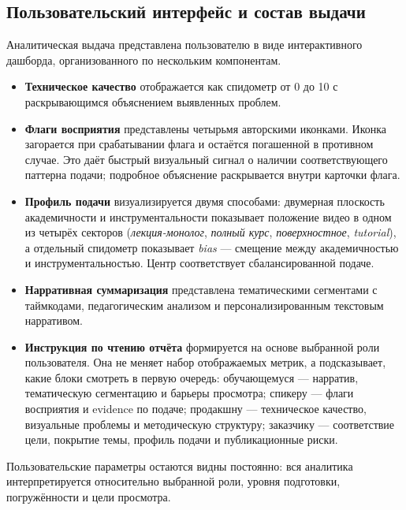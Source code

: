 \subsection{Пользовательский интерфейс и состав выдачи}
\label{subsec:ui-overview}

Аналитическая выдача представлена пользователю в виде интерактивного
дашборда, организованного по нескольким компонентам.

\begin{itemize}
    \item \textbf{Техническое качество} отображается как спидометр от 0 до 10
    с раскрывающимся объяснением выявленных проблем.

    \item \textbf{Флаги восприятия} представлены четырьмя авторскими иконками.
    Иконка загорается при срабатывании флага и остаётся погашенной
    в противном случае. Это даёт быстрый визуальный сигнал о наличии
    соответствующего паттерна подачи; подробное объяснение раскрывается
    внутри карточки флага.

    \item \textbf{Профиль подачи} визуализируется двумя способами:
    двумерная плоскость академичности и инструментальности показывает
    положение видео в одном из четырёх секторов
    (\textit{лекция-монолог}, \textit{полный курс},
    \textit{поверхностное}, \textit{tutorial}), а отдельный спидометр
    показывает \textit{bias} — смещение между академичностью
    и инструментальностью. Центр соответствует сбалансированной подаче.

    \item \textbf{Нарративная суммаризация} представлена тематическими
    сегментами с таймкодами, педагогическим анализом и персонализированным
    текстовым нарративом.

    \item \textbf{Инструкция по чтению отчёта} формируется на основе выбранной
    роли пользователя. Она не меняет набор отображаемых метрик, а подсказывает,
    какие блоки смотреть в первую очередь: обучающемуся — нарратив,
    тематическую сегментацию и барьеры просмотра; спикеру — флаги восприятия
    и evidence по подаче; продакшну — техническое качество, визуальные проблемы
    и методическую структуру; заказчику — соответствие цели, покрытие темы,
    профиль подачи и публикационные риски.
\end{itemize}

Пользовательские параметры остаются видны постоянно: вся аналитика
интерпретируется относительно выбранной роли, уровня подготовки,
погружённости и цели просмотра.

